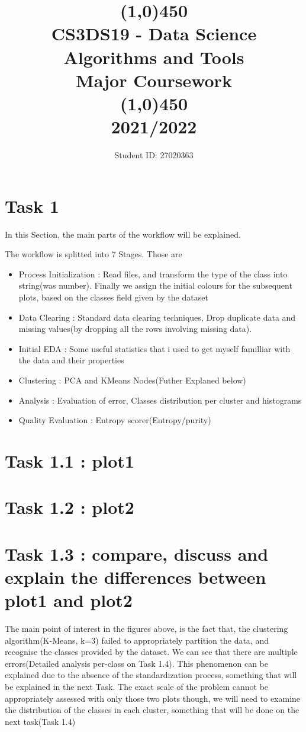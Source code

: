 \documentclass[12pt]{article}
\title{\line(1,0){450}\\ CS3DS19 - Data Science Algorithms and Tools \\ \large{Major Coursework }  \\\line(1,0){450} \\2021/2022}
\author{Student ID: 27020363}
\begin{document}
	\maketitle
	\pagebreak
	
	\section{Task 1}
		
		In this Section, the  main parts of the workflow will be explained.
		\begin{center}
		\end{center}
		The workflow is splitted into 7 Stages. Those are
		\begin{itemize}
			\item Process Initialization : Read files, and transform the type of the class into string(was number). Finally we assign the initial colours for the subsequent plots, based on the classes field given by the dataset
			\item Data Clearing : Standard data clearing techniques, Drop duplicate data and missing values(by dropping all the rows involving missing data).
			\item Initial EDA : Some useful statistics that i used to get myself familliar with the data and their properties
			\item Clustering : PCA and KMeans Nodes(Futher Explaned below)
			\item Analysis : Evaluation of error, Classes distribution per cluster and histograms
			\item Quality Evaluation : Entropy scorer(Entropy/purity)
		\end{itemize}
	
	\section*{Task 1.1 : plot1}
	
	 
	 \section*{Task 1.2 : plot2}
	 
	 
	 \section*{Task 1.3 : compare, discuss and explain the differences between plot1 and plot2}
		The main point of interest in the figures above, is the fact that, the clustering algorithm(K-Means, k=3) failed to appropriately partition the data, and recognise the classes provided by the dataset. We can see that there are multiple errors(Detailed analysis per-class on Task 1.4). This phenomenon can be explained due to the absence of the standardization process, something that will be explained in the next Task. The exact scale of the problem cannot be appropriately assessed with only those two plots though, we will need to examine the distribution of the classes in each cluster, something that will be done on the next task(Task 1.4)
	
\end{document}
